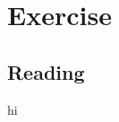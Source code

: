 \documentclass[]{scrartcl}
\newcommand{\exercise}{Exercise \thesection}
\begin{document}
\section*{\exercise}

\subsection{Reading}
hi
\end{document}
